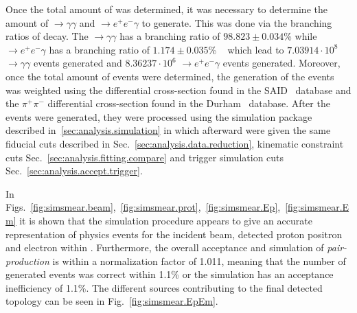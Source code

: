 Once the total amount of \piz was determined, it was necessary to determine the amount of \piz$\to \gamma \gamma$ and \piz $\to e^+e^- \gamma$ to generate. This was done via the branching ratios of \piz decay. The \piz $\to \gamma \gamma$ has a branching ratio of $98.823 \pm 0.034$\% while \piz$\to e^+e^- \gamma$ has a branching ratio of $1.174 \pm 0.035$\% ~\cite{pdg2014} which lead to $7.03914 \cdot10^8$ \piz $\to \gamma \gamma$ events generated and $8.36237 \cdot10^6$ \piz$\to e^+e^- \gamma$ events generated. Moreover, once the total amount of events were determined, the generation of the events was weighted using the \piz differential cross-section found in the SAID~\cite{SAID} database and the $\pi^+\pi^-$ differential cross-section found in the Durham~\cite{durham} database. After the events were generated, they were processed using the simulation package described in~\ref{sec:analysis.simulation} in which afterward were given the same fiducial cuts described in Sec.~\ref{sec:analysis.data.reduction}, kinematic constraint cuts Sec.~\ref{sec:analysis.fitting.compare} and trigger simulation cuts Sec.~\ref{sec:analysis.accept.trigger}. 

In Figs.~\ref{fig:simsmear.beam},~\ref{fig:simsmear.prot},~\ref{fig:simsmear.Ep},~\ref{fig:simsmear.Em} it is shown that the simulation procedure appears to give an accurate representation of physics events for the incident beam, detected proton positron and electron within . Furthermore, the overall acceptance and simulation of \emph{pair-production} is within a normalization factor of 1.011, meaning that the number of generated events was correct within 1.1\% or the simulation has an acceptance inefficiency of 1.1\%. The different sources contributing to the final detected \epem topology can be seen in Fig.~\ref{fig:simsmear.EpEm}. 


